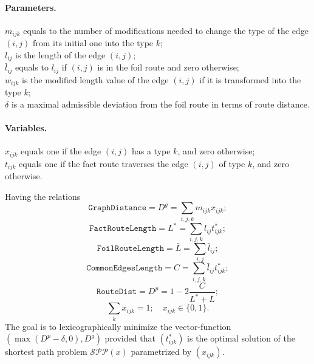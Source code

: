 \documentclass{article}
\begin{document}
\paragraph{Parameters.} $m_{ijk}$ equals to the number of modifications needed to change the type of the edge $(i, j)$ from its initial one into the type $k$;\\
$l_{ij}$ is the length of the edge $(i, j)$;\\
$\bar{l}_{ij}$ equals to $l_{ij}$ if $(i, j)$ is in the foil route and zero otherwise;\\
$w_{ijk}$ is the modified length value of the edge $(i, j)$ if it is transformed into the type $k$;\\
$\delta$ is a maximal admissible deviation from the foil route in terms of route distance.
\paragraph{Variables.}
$x_{ijk}$ equals one if the edge $(i, j)$ has a type $k$, and zero otherwise;\\
$t_{ijk}$ equals one if the fact route traverses the edge $(i, j)$ of type $k$, and zero otherwise.

Having the relations
\begin{equation}
\label{eq:1}
	\mathtt{GraphDistance} = D^g = \sum_{i, j, k} m_{ijk} x_{ijk};
\end{equation}
\begin{equation}
\label{eq:2}
	\mathtt{FactRouteLength} = L^* = \sum_{i, j, k} l_{ij}t^*_{ijk};
\end{equation}
\begin{equation}
\label{eq:3}
	\mathtt{FoilRouteLength} = \bar{L} = \sum_{i, j} \bar{l}_{ij};
\end{equation}
\begin{equation}
\label{eq:4}
    \mathtt{CommonEdgesLength} = C = \sum_{i, j, k} \bar{l}_{ij} t^*_{ijk};
\end{equation}
\begin{equation}
\label{eq:5}
	\mathtt{RouteDist} = D^p = 1 - 2\frac{C}{L^* + \bar{L}};
\end{equation}
\begin{equation}
\label{eq:6}
	\sum_k x_{ijk} = 1;\quad
	x_{ijk}\in \{0, 1\}.
\end{equation}
The goal is to lexicographically minimize the vector-function $(\max(D^p - \delta, 0), D^g)$ provided that $(t^*_{ijk})$ is the optimal solution of the shortest path problem $\mathcal{SPP}(x)$ parametrized by $(x_{ijk})$.
\end{document}
